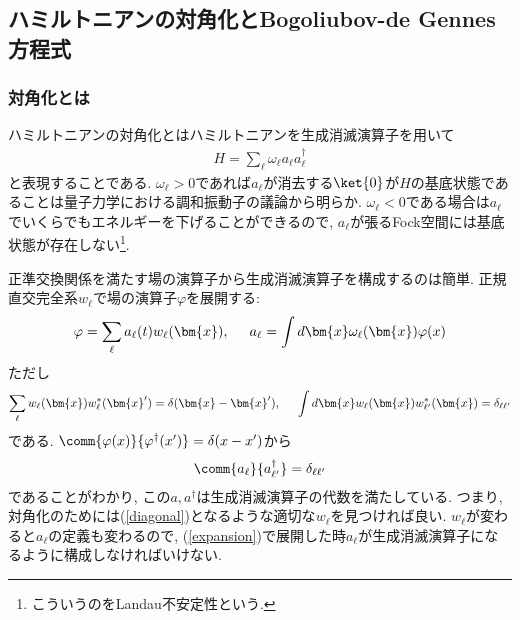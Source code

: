 \subsection{ハミルトニアンの対角化とBogoliubov-de Gennes方程式}
\subsubsection{対角化とは}
ハミルトニアンの対角化とはハミルトニアンを生成消滅演算子を用いて
\begin{eqnarray}
  H = \sum_\ell \omega_{\ell} a_\ell a_\ell^\dagger\label{diagonal}
\end{eqnarray}
と表現することである. $\omega_\ell>0$であれば$a_\ell$が消去する$\ket{0}$が$H$の基底状態であることは量子力学における調和振動子の議論から明らか. $\omega_\ell < 0$である場合は$a_\ell$でいくらでもエネルギーを下げることができるので, $a_\ell$が張るFock空間には基底状態が存在しない\footnote{こういうのをLandau不安定性という. }.

正準交換関係を満たす場の演算子から生成消滅演算子を構成するのは簡単. 正規直交完全系$w_\ell$で場の演算子$\varphi$を展開する:
\begin{eqnarray}
  \varphi = \sum_\ell a_\ell(t)w_\ell(\bm{x}), \hspace{0.5cm} a_\ell = \int d\bm{x} \omega_\ell(\bm{x})\varphi(x)\label{expansion}
\end{eqnarray}
ただし
\begin{eqnarray}
  \sum_\ell w_\ell(\bm{x}) w^*_\ell(\bm{x}') = \delta(\bm{x}-\bm{x}'),\hspace{0.5cm}  \int d\bm{x} w_\ell(\bm{x}) w^*_{\ell'}(\bm{x}) = \delta_{\ell\ell'}
\end{eqnarray}
である. 
$\comm{\varphi(x)}{\varphi^\dagger(x')} = \delta(x - x')$から
\begin{eqnarray}
  \comm{a_\ell}{a^\dagger_{\ell'}} = \delta_{\ell\ell'}
\end{eqnarray}
であることがわかり, この$a, a^\dagger$は生成消滅演算子の代数を満たしている. つまり, 対角化のためには(\ref{diagonal})となるような適切な$w_\ell$を見つければ良い. $w_\ell$が変わると$a_\ell$の定義も変わるので, (\ref{expansion})で展開した時$a_\ell$が生成消滅演算子になるように構成しなければいけない. 

